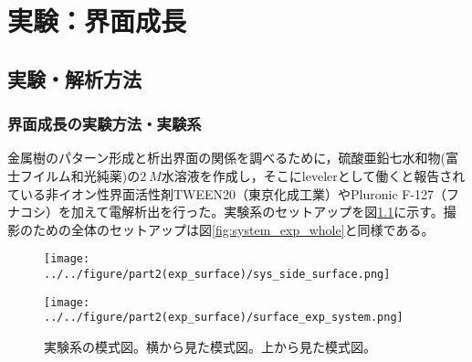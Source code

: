 \documentclass[autodetect-engine,dvi=dvipdfmx,a4paper,ja=standard,oneside,openany,11pt]{bxjsbook}
\begin{document}
\chapter{実験：界面成長}
\section{実験・解析方法}
\subsection{界面成長の実験方法・実験系}
金属樹のパターン形成と析出界面の関係を調べるために，硫酸亜鉛七水和物(富士フイルム和光純薬)の$\SI{2}{M}$水溶液を作成し，そこにlevelerとして働くと報告されている\cite{song2024widely}非イオン性界面活性剤TWEEN20（東京化成工業）やPluronic F-127（フナコシ）を加えて電解析出を行った。実験系のセットアップを図\ref{fig:surface_exp_system}に示す。撮影のための全体のセットアップは図\ref{fig:system_exp_whole}と同様である。

\begin{figure}[htbp]
  \begin{minipage}
    {0.55\textwidth}
    \subcaption{}
    \centering
    \texttt{[image: ../../figure/part2(exp\_surface)/sys\_side\_surface.png]}
    \label{fig:sys_side_surface}
  \end{minipage}
  \begin{minipage}{0.4\hsize}
    \subcaption{}
    \centering
    \texttt{[image: ../../figure/part2(exp\_surface)/surface\_exp\_system.png]}
    \label{fig:sys_top_surface}
  \end{minipage}
  \caption{実験系の模式図。横から見た模式図。上から見た模式図。}
  \label{fig:surface_exp_system}
\end{figure}
\end{document}
